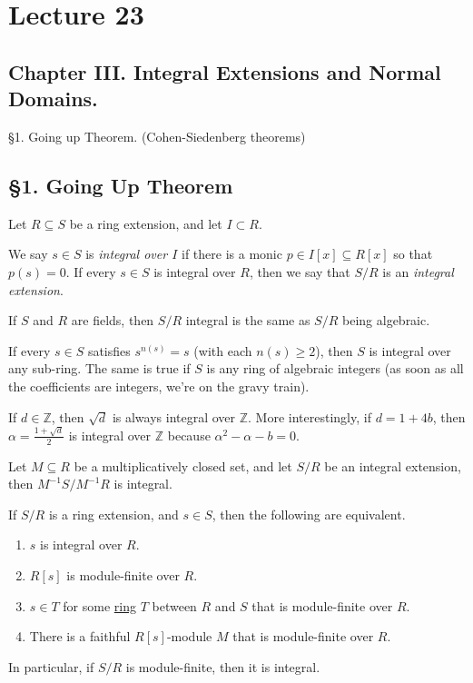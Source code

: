  \section{Lecture 23}

 \subsection{Chapter III. Integral Extensions and Normal Domains.}%
 \S 1. Going up Theorem. (Cohen-Siedenberg theorems)\\

 \subsection{\S 1. Going Up Theorem}
 Let $R\subseteq S$ be a ring extension, and let $I\subset R$.
 \begin{definition}
   We say $s\in S$ is \emph{integral over $I$} if there is a monic $p\in I[x]\subseteq
   R[x]$ so that $p(s)=0$. If every $s\in S$ is integral over $R$, then we say that $S/R$
   is an \emph{integral extension}.
 \end{definition}
 \begin{example}
   If $S$ and $R$ are fields, then $S/R$ integral is the same as $S/R$ being algebraic.
 \end{example}
 \begin{example}
   If every $s\in S$ satisfies $s^{n(s)}=s$ (with each $n(s)\ge 2$), then $S$ is integral
   over any sub-ring. The same is true if $S$ is any ring of algebraic integers (as soon
   as all the coefficients are integers, we're on the gravy train).
 \end{example}
 \begin{example}
   If $d\in \mathbb{Z}$, then $\sqrt d$ is always integral over $\mathbb{Z}$. More interestingly, if
   $d=1+4b$, then $\alpha=\frac{1+\sqrt d}{2}$ is integral over $\mathbb{Z}$ because
   $\alpha^2-\alpha-b=0$.
 \end{example}
 \begin{example}
   Let $M\subseteq R$ be a multiplicatively closed set, and let $S/R$ be an integral
   extension, then $M^{-1}S/M^{-1}R$ is integral.
 \end{example}
 \begin{proposition}
   If $S/R$ is a ring extension, and $s\in S$, then the following are equivalent.
   \begin{enumerate}
     \item $s$ is integral over $R$.
     \item $R[s]$ is module-finite over $R$.
     \item $s\in T$ for some \underline{ring} $T$ between $R$ and $S$ that is
     module-finite over $R$.
     \item There is a faithful $R[s]$-module $M$ that is module-finite over $R$.
   \end{enumerate}
   In particular, if $S/R$ is module-finite, then it is integral.
 \end{proposition}
